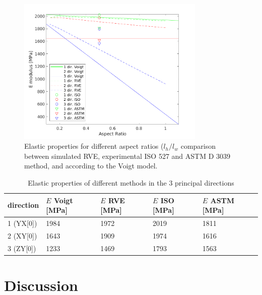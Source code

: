 \begin{figure}[htb]
    \centering
    \includegraphics[width=0.80\textwidth]{chapter_6_Elasticmodelling/figures/Elasticproperties.png}
    \caption{Elastic properties for different aspect ratios ($l_h/l_w$ comparison between simulated RVE, experimental ISO 527 and ASTM D 3039 method, and according to the Voigt model.}
    \label{fig:Elasticproperties}
\end{figure}

\begin{table}
\caption{Elastic properties of different methods in the 3 principal directions}
\label{tab:Elasticproperties}
\begin{tabular}{p{2.2cm}p{2.2cm}p{2.2cm}p{2.2cm}p{2.2cm}}
 \hline
direction & $E$ Voigt [MPa] & $E$ RVE [MPa]& $E$ ISO [MPa]& $E$ ASTM [MPa] \\ 
\hline
1 (YX[0]) & 1984 & 1972 & 2019 & 1811 \\
2 (XY[0]) & 1643 & 1909 & 1974 & 1616 \\
3 (ZY[0]) & 1233 & 1469 & 1793 & 1563 \\
 \hline
\end{tabular}
\end{table}

\section{Discussion}
